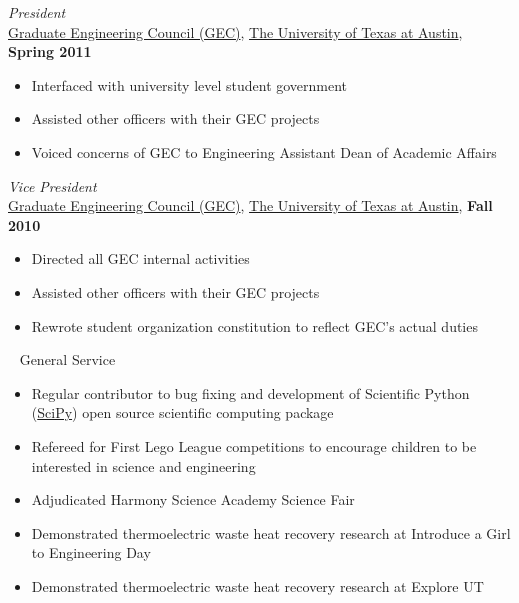 \documentclass[centered]{res}
\begin{document}
\begin{resume}
\textit{President} \\
\href{http://sites.google.com/site/utexasgecouncil/}{Graduate Engineering Council (GEC)},
\href{http://www.utexas.edu}{The University of Texas at Austin},
\hfill \textbf{Spring 2011}
\begin{itemize} \itemsep -2pt %
\item Interfaced with university level student government
\item Assisted other officers with their GEC projects
\item Voiced concerns of GEC to Engineering Assistant Dean of Academic
  Affairs 
\end{itemize}

\textit{Vice President} \\
\href{http://sites.google.com/site/utexasgecouncil/}{Graduate Engineering Council (GEC)},
\href{http://www.utexas.edu}{The University of Texas at Austin},
  \hfill \textbf{Fall 2010}
  \begin{itemize} \itemsep -2pt %
  \item Directed all GEC internal activities
  \item Assisted other officers with their GEC projects
  \item Rewrote student organization constitution to reflect GEC's actual duties
  \end{itemize}~
%
General Service
\begin{itemize} \itemsep -2pt %
\item Regular contributor to bug fixing and development of Scientific
  Python (\href{http://www.scipy.org/}{SciPy}) open source scientific
  computing package
\item Refereed for First Lego League competitions to encourage
  children to be interested in science and engineering
\item Adjudicated Harmony Science Academy Science Fair
\item Demonstrated thermoelectric waste heat recovery research at
  Introduce a Girl to Engineering Day
\item Demonstrated thermoelectric waste heat recovery research at
  Explore UT 
\end{itemize}


\end{resume}
\end{document}
